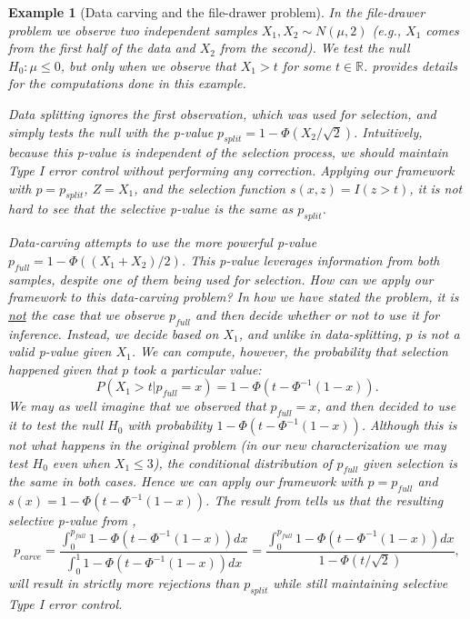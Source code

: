 \documentclass{article}
\newtheorem{example}{Example}
\newcommand{\R}{\mathbb{R}}
\begin{document}
\begin{example}[Data carving and the file-drawer problem]
    \label{exm:carve}
    In the file-drawer problem we observe two independent samples $X_1, X_2 \sim N(\mu, 2)$ (e.g., $X_1$ comes from the first half of the data and $X_2$ from the second). We test the null $H_0: \mu \leq 0$, but only when we observe that $X_1 > t$ for some $t \in \R$.  provides details for the computations done in this example. 
    
    Data splitting ignores the first observation, which was used for selection, and simply tests the null with the  p-value $p_{split} = 1 - \Phi(X_2/\sqrt{2}) $. Intuitively, because this p-value is independent of the selection process, we should maintain Type I error control without performing any correction. Applying our framework with $p = p_{split}$, $Z = X_1$, and the selection function $s(x, z) = I(z > t)$, it is not hard to see that the selective p-value is the same as $p_{split}$. 
    
   Data-carving attempts to use the more powerful p-value $p_{full} = 1 - \Phi( (X_1 + X_2)/2 )$. This p-value leverages information from both samples, despite one of them being used for selection. How can we apply our framework to this data-carving problem? In how we have stated the problem, it is \underline{not} the case that we observe $p_{full}$ and then decide whether or not to use it for inference. Instead, we decide based on $X_1$, and unlike in data-splitting, $p$ is not a valid p-value given $X_1$. We can compute, however, the probability that selection happened given that $p$ took a particular value:
    \begin{equation*}
        P(X_1 > t | p_{full} = x) = 1 - \Phi(t - \Phi^{-1}(1-x)). 
    \end{equation*}
    We may as well imagine that we observed that $p_{full} = x$, and then decided to use it to test the null $H_0$ with probability $1 - \Phi(t - \Phi^{-1}(1-x))$. Although this is not what happens in the original problem (in our new characterization we may test $H_0$ even when $X_1 \leq 3$), the conditional distribution of $p_{full}$ given selection is the same in both cases. Hence we can apply our framework with $p = p_{full}$ and $s(x) = 1 - \Phi(t - \Phi^{-1}(1-x))$. The result from \cite{Fithian2017} tells us that the resulting selective p-value from ,
    \begin{equation*}
        p_{carve} = \frac{\int_0^{p_{full}}  1 - \Phi(t - \Phi^{-1}(1-x)) dx}{\int_0^1  1 - \Phi(t - \Phi^{-1}(1-x)) dx} = \frac{\int_0^{p_{full}}  1 - \Phi(t - \Phi^{-1}(1-x))dx }{1 - \Phi(t/\sqrt{2})}, 
    \end{equation*}
    will result in strictly more rejections than $p_{split}$ while still maintaining selective Type I error control. 
\end{example}
\end{document}
